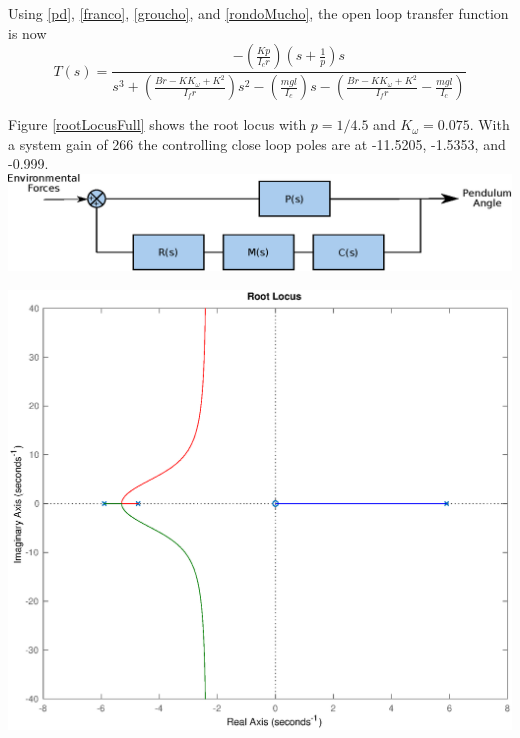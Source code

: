 \documentclass[12pt,letterpaper]{article}
\begin{document}
Using \eqref{pd}, \eqref{franco}, \eqref{groucho}, and \eqref{rondoMucho}, the open loop transfer function is now
\begin{equation}
	T(s) =\frac{-(\frac{Kp} {I_{c}r})(s+\frac{1}{p})s}
	{s^3 + (\frac{B r-K K_{\omega}+K^2}{I_{f}r})s^2 - (\frac{m g l}{I_{c}})s - (\frac{Br-K K_{\omega}+K^2}{I_{f}r} - \frac{m g l}{I_{c}})}\label{eq.openLoop}
\end{equation}

Figure \ref{rootLocusFull} shows the root locus with $p = 1/4.5$ and $K_{\omega} = 0.075$.  With a system gain of 266 the controlling close loop poles are at -11.5205, -1.5353, and -0.999.\\

\includegraphics[width=\textwidth]{images/transferFunction.eps}
    \label{transferFunction}

\includegraphics[width=\textwidth]{images/rootLocus.eps} 
    \label{rootLocus}
\end{document}
